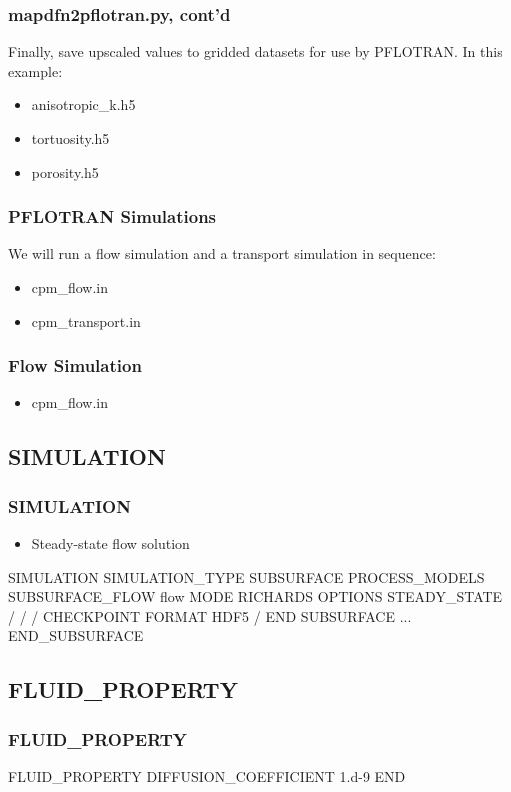 \documentclass{beamer}
\newcommand\magentacomment[1]{{{\color{magenta} #1}}}
\begin{document}
\begin{frame} \frametitle{mapdfn2pflotran.py, cont'd}
	Finally, save upscaled values to gridded datasets for use by PFLOTRAN. In this example:
	\begin{itemize}
		\item anisotropic\_k.h5
		\item tortuosity.h5
		\item porosity.h5
	\end{itemize}
	
\end{frame}

\begin{frame} [fragile,]\frametitle{PFLOTRAN Simulations}
	We will run a flow simulation and a transport simulation in sequence:
	\begin{itemize}
		\item cpm\_flow.in
		\item cpm\_transport.in
	\end{itemize}
\end{frame}

\begin{frame} [fragile,]\frametitle{Flow Simulation}
	\begin{itemize}
		\item cpm\_flow.in
	\end{itemize}
\end{frame}

\subsection{SIMULATION}

\begin{frame}\frametitle{SIMULATION}

\begin{itemize}
  \item Steady-state flow solution
\end{itemize}
\begin{semiverbatim}
SIMULATION
  SIMULATION_TYPE SUBSURFACE
  PROCESS_MODELS
    SUBSURFACE_FLOW flow
      MODE RICHARDS
      \magentacomment{OPTIONS
         STEADY_STATE
       /}
    /
/
\magentacomment{CHECKPOINT
FORMAT HDF5
/}
END
SUBSURFACE
  ...
END_SUBSURFACE
\end{semiverbatim}

\end{frame}
\subsection{FLUID\_PROPERTY}
\begin{frame}\frametitle{FLUID\_PROPERTY}
	\begin{semiverbatim}
		FLUID_PROPERTY
		  DIFFUSION_COEFFICIENT 1.d-9
		END
	\end{semiverbatim}
\end{frame}
\end{document}
